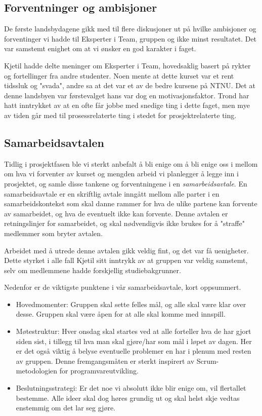 \subsection{Forventninger og ambisjoner}
De første landsbydagene gikk med til flere diskusjoner ut på hvilke ambisjoner og forventinger vi hadde til Eksperter i Team, gruppen og ikke minst resultatet. Det var samstemt enighet om at vi ønsker en god karakter i faget.

Kjetil hadde delte meninger om Eksperter i Team, hovedsaklig basert på rykter og fortellinger fra andre studenter. Noen mente at dette kurset var et rent tidssluk og "svada", andre sa at det var et av de bedre kursene på NTNU. Det at denne landsbyen var førstevalget hans var dog en motivasjonsfaktor. Trond har hatt inntrykket av at en ofte får jobbe med snedige ting i dette faget, men mye av tiden går med til prosessrelaterte ting i stedet for prosjektrelaterte ting.

\subsection{Samarbeidsavtalen}
Tidlig i prosjektfasen ble vi sterkt anbefalt å bli enige om å bli enige oss i mellom om hva vi forventer av kurset og mengden arbeid vi planlegger å legge inn i prosjektet, og samle disse tankene og forventningene i en \emph{samarbeidsavtale}. En samarbeidsavtale er en skriftlig avtale inngått mellom alle parter i en samarbeidskontekst som skal danne rammer for hva de ulike partene kan forvente av samarbeidet, og hva de eventuelt ikke kan forvente. Denne avtalen er retningslinjer for samarbeidet, og skal nødvendigvis ikke brukes for å "straffe" medlemmer som bryter avtalen\cite{samarbeidsavtale}.

Arbeidet med å utrede denne avtalen gikk veldig fint, og det var få uenigheter. Dette styrket i alle fall Kjetil sitt inntrykk av at gruppen var veldig samstemt, selv om medlemmene hadde forskjellig studiebakgrunner.

Nedenfor er de viktigste punktene i vår samarbeidsavtale, kort oppsummert.

\begin{itemize}
	\item Hovedmomenter: Gruppen skal sette felles mål, og alle skal være klar over desse. Gruppen skal være åpen for at alle skal komme med innspill.
	\item Møtestruktur: Hver onsdag skal startes ved at alle forteller hva de har gjort siden sist, i tillegg til hva man skal gjøre/har som mål i løpet av dagen. Her er det også viktig å belyse eventuelle problemer en har i plenum med resten av gruppen. Denne fremgangsmåten er sterkt inspirert av Scrum-metodologien\cite{Scrum} for programvareutvikling.
	\item Beslutningsstrategi: Er det noe vi absolutt ikke blir enige om, vil flertallet bestemme. Alle ideer skal dog høres grundig ut og skal helst skje vedtas enstemmig om det lar seg gjøre.
\end{itemize}

